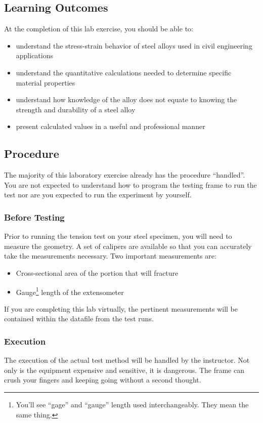 \documentclass[12pt]{article}
\begin{document}
\subsection{Learning Outcomes}
At the completion of this lab exercise, you should be able to:
\begin{itemize}
    \item understand the stress-strain behavior of steel alloys used in civil engineering applications
    \item understand the quantitative calculations needed to determine specific material properties
    \item understand how knowledge of the alloy does not equate to knowing the strength and durability of a steel alloy
    \item present calculated values in a useful and professional manner
\end{itemize}

\pagebreak
\subsection{Procedure}
The majority of this laboratory exercise already has the procedure ``handled''. You are not expected to understand how to program the testing frame to run the test nor are you expected to run the experiment by yourself.

\subsubsection{Before Testing}
Prior to running the tension test on your steel specimen, you will need to measure the geometry. A set of calipers are available so that you can accurately take the measurements necessary. Two important measurements are:
\begin{itemize}
    \item Cross-sectional area of the portion that will fracture
    \item Gauge\footnote{You'll see ``gage'' and ``gauge'' length used interchangeably. They mean the same thing.} length of the extensometer
\end{itemize}

If you are completing this lab virtually, the pertinent measurements will be contained within the datafile from the test runs.

\subsubsection{Execution}
The execution of the actual test method will be handled by the instructor. Not only is the equipment expensive and sensitive, it is dangerous. The frame can crush your fingers and keeping going without a second thought.
\end{document}
